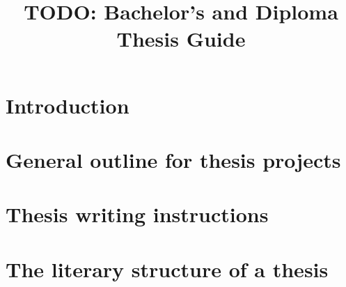 \documentclass[english, online, cse, master]{dithesis} %
\title{TODO: Bachelor's and Diploma Thesis Guide}
\providecommand{\DIFaddbegin}{} %
\providecommand{\DIFaddend}{} %
\providecommand{\DIFdelbegin}{} %
\providecommand{\DIFdelend}{} %
\begin{document}
\DIFaddbegin \pagestyle{empty}
\DIFaddend \maketitlepage
    \DIFaddbegin \makecopyrightpage
\DIFaddend 

    \DIFaddbegin {} {
  \DIFaddend 
  \DIFdelbegin %

\DIFdelend 
  \DIFaddbegin {}
}
\DIFaddend 

\contents %
\DIFdelbegin %

\DIFdelend 
\DIFdelbegin %

\DIFdelend 

\DIFaddbegin \mainmatter

\DIFaddend \chapter{Introduction} %
  \label{introduction} %
  \DIFdelbegin %
\DIFdelend  %

\chapter{General outline for thesis projects}
  \label{relatedwork}
  

\chapter{Thesis writing instructions}
  \label{implementation}
  

\chapter{The literary structure of a thesis}
  \label{experiments}
  
\end{document}
